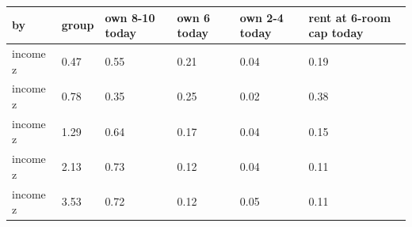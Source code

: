 \begingroup\small
\setlength{\tabcolsep}{3pt}
\renewcommand{\arraystretch}{1.04}
\begin{tabularx}{\linewidth}{XXXXXX}
\toprule
by & group & own 8-10 today & own 6 today & own 2-4 today & rent at 6-room cap today \\
\midrule
income z & 0.47 & 0.55 & 0.21 & 0.04 & 0.19 \\
income z & 0.78 & 0.35 & 0.25 & 0.02 & 0.38 \\
income z & 1.29 & 0.64 & 0.17 & 0.04 & 0.15 \\
income z & 2.13 & 0.73 & 0.12 & 0.04 & 0.11 \\
income z & 3.53 & 0.72 & 0.12 & 0.05 & 0.11 \\
\bottomrule
\end{tabularx}
\endgroup
